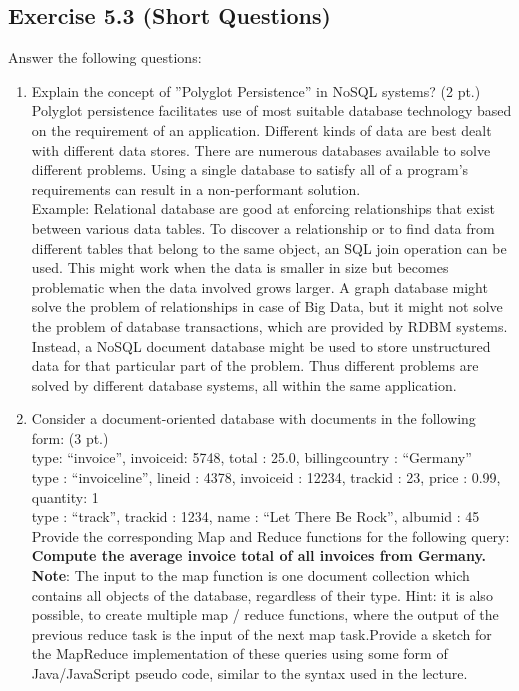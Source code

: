 \documentclass[10pt]{article}
\begin{document}
		
	
		\clearpage
	\subsection*{Exercise 5.3 (Short Questions)}
	Answer the following questions:

	\begin{enumerate}
		\item Explain the concept of ”Polyglot Persistence” in NoSQL systems? (2 pt.)\\
	Polyglot persistence facilitates use of most suitable database technology based on the requirement of an application. Different kinds of data are best dealt with different data stores. There are numerous databases available to solve different problems. Using a single database to satisfy all of a program's requirements can result in a non-performant solution.\\
	 Example:  Relational database are good at enforcing relationships that exist between various data tables. To discover a relationship or to find data from different tables that belong to the same object, an SQL join operation can be used. This might work when the data is smaller in size but becomes problematic when the data involved grows larger. A graph database might solve the problem of relationships in case of Big Data, but it might not solve the problem of database transactions, which are provided by RDBM systems. Instead, a NoSQL document database might be used to store unstructured data for that particular part of the problem. Thus different problems are solved by different database systems, all within the same application.
		
		
		\item Consider a document-oriented database with documents in the following form: (3 pt.)\\
		{ type: “invoice”, invoiceid: 5748, total : 25.0, billingcountry : “Germany” }\\
		{ type : “invoiceline”, lineid : 4378, invoiceid : 12234, trackid : 23, price : 0.99, quantity: 1
		}
\\
	{ type : “track”, trackid : 1234, name : “Let There Be Rock”, albumid : 45 }\\
	Provide the corresponding Map and Reduce functions for the following query:\\
	\textbf{Compute the average invoice total of all invoices from Germany.}\\
	\textbf{Note}: The input to the map function is one document collection which contains all objects
	of the database, regardless of their type. Hint: it is also possible, to create multiple map /
	reduce functions, where the output of the previous reduce task is the input of the next map
	task.Provide a sketch for the MapReduce implementation of these queries using some form
	of Java/JavaScript pseudo code, similar to the syntax used in the lecture.
		

\end{enumerate}
\end{document}
